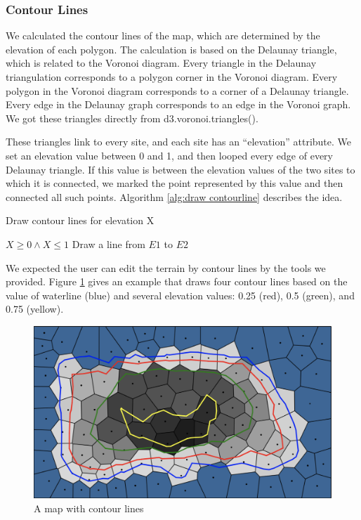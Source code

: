 \subsubsection{Contour Lines}
We calculated the contour lines of the map, which are determined by the elevation of each polygon. The calculation is based on the Delaunay triangle, which is related to the Voronoi diagram. Every triangle in the Delaunay triangulation corresponds to a polygon corner in the Voronoi diagram. Every polygon in the Voronoi diagram corresponds to a corner of a Delaunay triangle. Every edge in the Delaunay graph corresponds to an edge in the Voronoi graph. We got these triangles directly from d3.voronoi.triangles().

These triangles link to every site, and each site has an ``elevation'' attribute. We set an elevation value between 0 and 1, and then looped every edge of every Delaunay triangle. If this value is between the elevation values of the two sites to which it is connected, we marked the point represented by this value and then connected all such points. Algorithm \ref{alg:draw contourline} describes the idea.

\begin{algorithm}
\caption{Draw contour lines for elevation X}
\label{alg:draw contourline}
\begin{algorithmic}
\REQUIRE $X \geq 0 \wedge X \leq 1$
\STATE Draw a line from $E1$ to $E2$
\ENDIF
\ENDFOR
\ENDFOR
\end{algorithmic}
\end{algorithm}

We expected the user can edit the terrain by contour lines by the tools we provided. Figure \ref{fig:contour line} gives an example that draws four contour lines based on the value of waterline (blue) and several elevation values: 0.25 (red), 0.5 (green), and 0.75 (yellow).

\begin{figure}[htbp]
  \includegraphics[width=\textwidth]{section04/assets/Map-contourline.png}
  \caption{A map with contour lines}
  \label{fig:contour line}
\end{figure}

